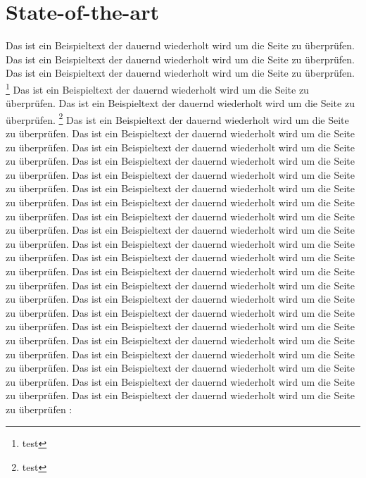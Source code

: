 \section{State-of-the-art}
\label{cha:background}
Das ist ein Beispieltext der dauernd wiederholt wird um die Seite zu überprüfen.
Das ist ein Beispieltext der dauernd wiederholt wird um die Seite zu überprüfen.  Das ist ein Beispieltext der dauernd wiederholt wird um die Seite zu überprüfen. \footnote{test} Das ist ein Beispieltext der dauernd wiederholt wird um die Seite zu überprüfen. Das ist ein Beispieltext der dauernd wiederholt wird um die Seite zu überprüfen. \footnote{test} Das ist ein Beispieltext der dauernd wiederholt wird um die Seite zu überprüfen. \cite{Delpero135504} Das ist ein Beispieltext der dauernd wiederholt wird um die Seite zu überprüfen. Das ist ein Beispieltext der dauernd wiederholt wird um die Seite zu überprüfen. \cite{Delpero153030}Das ist ein Beispieltext der dauernd wiederholt wird um die Seite zu überprüfen. Das ist ein Beispieltext der dauernd wiederholt wird um die Seite zu überprüfen. Das ist ein Beispieltext der dauernd wiederholt wird um die Seite zu überprüfen. Das ist ein Beispieltext der dauernd wiederholt wird um die Seite zu überprüfen. Das ist ein Beispieltext der dauernd wiederholt wird um die Seite zu überprüfen. Das ist ein Beispieltext der dauernd wiederholt wird um die Seite zu überprüfen. Das ist ein Beispieltext der dauernd wiederholt wird um die Seite zu überprüfen. \cite{Ermanni108331}Das ist ein Beispieltext der dauernd wiederholt wird um die Seite zu überprüfen. Das ist ein Beispieltext der dauernd wiederholt wird um die Seite zu überprüfen. Das ist ein Beispieltext der dauernd wiederholt wird um die Seite zu überprüfen. Das ist ein Beispieltext der dauernd wiederholt wird um die Seite zu überprüfen. Das ist ein Beispieltext der dauernd wiederholt wird um die Seite zu überprüfen. Das ist ein Beispieltext der dauernd wiederholt wird um die Seite zu überprüfen. Das ist ein Beispieltext der dauernd wiederholt wird um die Seite zu überprüfen. Das ist ein Beispieltext der dauernd wiederholt wird um die Seite zu überprüfen. Das ist ein Beispieltext der dauernd wiederholt wird um die Seite zu überprüfen. Das ist ein Beispieltext der dauernd wiederholt wird um die Seite zu überprüfen. Das ist ein Beispieltext der dauernd wiederholt wird um die Seite zu überprüfen \cite{Schlaepfer127194}:
